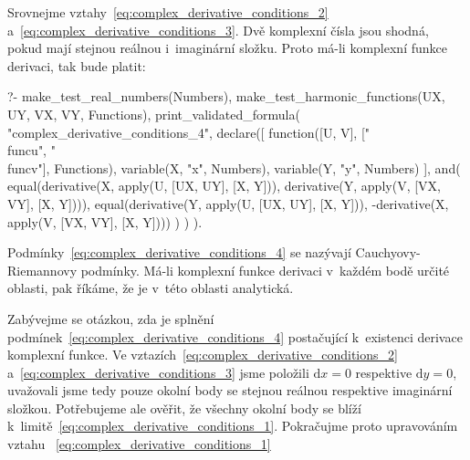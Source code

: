 Srovnejme vztahy~\eqref{eq:complex_derivative_conditions_2} a~\eqref{eq:complex_derivative_conditions_3}. Dvě komplexní čísla jsou shodná, pokud mají stejnou reálnou i~imaginární složku. Proto má-li komplexní funkce derivaci, tak bude platit:

\begin{prolog}
?-	make_test_real_numbers(Numbers),
	make_test_harmonic_functions(UX, UY, VX, VY, Functions),
	print_validated_formula(
		"complex_derivative_conditions_4",
		declare([
			function([U, V], ["\\func{u}", "\\func{v}"], Functions),
			variable(X, "x", Numbers),
			variable(Y, "y", Numbers)
		],
			and(
				equal(derivative(X, apply(U, [UX, UY], [X, Y])), derivative(Y, apply(V, [VX, VY], [X, Y]))),
				equal(derivative(Y, apply(U, [UX, UY], [X, Y])), -derivative(X, apply(V, [VX, VY], [X, Y])))
			)
		)
	).
\end{prolog}

Podmínky~\eqref{eq:complex_derivative_conditions_4} se nazývají Cauchyovy-Riemannovy podmínky. 
Má-li komplexní funkce derivaci v~každém bodě určité oblasti, pak říkáme, že je v~této oblasti analytická.

Zabývejme se otázkou, zda je splnění podmínek~\eqref{eq:complex_derivative_conditions_4} postačující k~existenci derivace komplexní funkce. Ve vztazích~\eqref{eq:complex_derivative_conditions_2} a~\eqref{eq:complex_derivative_conditions_3} jsme položili \(\mathrm{d}x = 0\) respektive \(\mathrm{d}y = 0\), uvažovali jsme tedy pouze okolní body se stejnou reálnou respektive imaginární složkou. Potřebujeme ale ověřit, že všechny okolní body se blíží k~limitě~\eqref{eq:complex_derivative_conditions_1}. Pokračujme proto upravováním vztahu
~\eqref{eq:complex_derivative_conditions_1}

